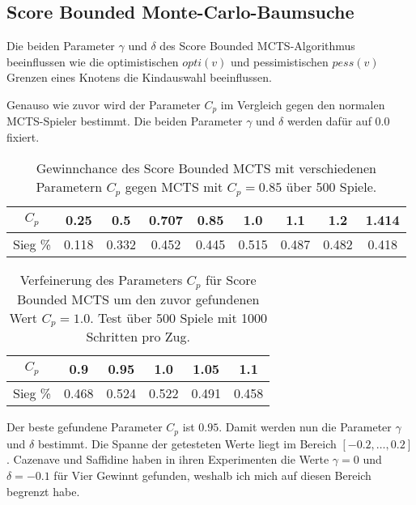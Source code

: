 \pagebreak[1]
\subsection{Score Bounded Monte-Carlo-Baumsuche}

Die beiden Parameter $\gamma$ und $\delta$ des Score Bounded MCTS-Algorithmus beeinflussen wie die optimistischen $opti(v)$ und pessimistischen $pess(v)$ Grenzen eines Knotens die Kindauswahl beeinflussen.

Genauso wie zuvor wird der Parameter $C_p$ im Vergleich gegen den normalen MCTS-Spieler bestimmt. Die beiden Parameter $\gamma$ und $\delta$ werden dafür auf $0.0$ fixiert. 

\medskip
\pagebreak[3]
\begin{table}[h!]
	\centering
	\begin{tabular}{|c||c|c|c|c|c|c|c|c|}
		\hline
		$C_p$ & 0.25 & 0.5 & 0.707 & 0.85 & 1.0 & 1.1 & 1.2 & 1.414 \\
		\hline
		Sieg \% & 0.118 & 0.332 & 0.452 & 0.445 & 0.515 & 0.487 & 0.482 & 0.418 \\
		\hline
	\end{tabular}
	\caption{Gewinnchance des Score Bounded MCTS mit verschiedenen Parametern $C_p$ gegen MCTS mit $C_p=0.85$ über 500 Spiele.}
	\label{tab:score-bounded-cp-1}
\end{table}

\begin{table}[h!]
	\centering
	\begin{tabular}{|c||c|c|c|c|c|}
		\hline
		$C_p$ & 0.9 & 0.95 & 1.0 & 1.05 & 1.1 \\
		\hline
		Sieg \% & 0.468 & 0.524 & 0.522 & 0.491 & 0.458 \\
		\hline
	\end{tabular}
	\caption{Verfeinerung des Parameters $C_p$ für Score Bounded MCTS um den zuvor gefundenen Wert $C_p=1.0$. Test über 500 Spiele mit 1000 Schritten pro Zug.}
	\label{tab:score-bounded-cp-2}
\end{table}

Der beste gefundene Parameter $C_p$ ist $0.95$. Damit werden nun die Parameter $\gamma$ und $\delta$ bestimmt. Die Spanne der getesteten Werte liegt im Bereich $\left[-0.2,\dots,0.2\right]$. Cazenave und Saffidine haben in ihren Experimenten\autocite[\ppno~11]{cazenaveScoreBoundedMonteCarlo2011} die Werte $\gamma=0$ und $\delta=-0.1$ für Vier Gewinnt gefunden, weshalb ich mich auf diesen Bereich begrenzt habe. 

